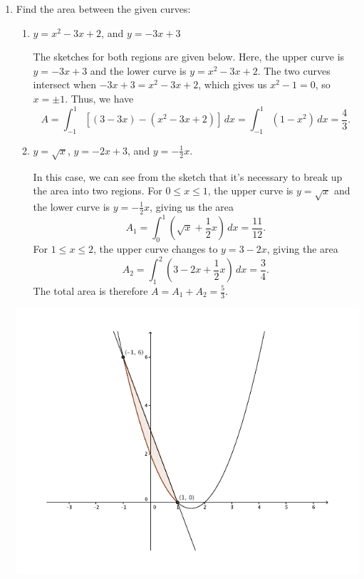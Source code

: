 \documentclass[12pt]{article}
\begin{document}
\begin{enumerate}
\begin{enumerate}
\end{enumerate}
 \item Find the area between the given curves:
\begin{enumerate}
 \item $y=x^2-3x+2$, and $y=-3x+3$

The sketches for both regions are given below. Here, the upper curve is $y=-3x+3$ and the lower curve is $y=x^2-3x+2$. The two curves intersect when $-3x+3=x^2-3x+2$, which gives us $x^2-1=0$, so $x=\pm 1$. Thus, we have
\[
 A = \int_{-1}^1[(3-3x)-(x^2-3x+2)]\,dx = \int_{-1}^1(1-x^2)\,dx = \frac{4}{3}.
\]


 \item $y=\sqrt{x}$, $y=-2x+3$, and $y=-\frac{1}{2}x$.

In this case, we can see from the sketch that it's necessary to break up the area into two regions. For $0\leq x\leq 1$, the upper curve is $y=\sqrt{x}$ and the lower curve is $y=-\frac{1}{2}x$, giving us the area
\[
 A_1 = \int_0^1\left(\sqrt{x}+\frac{1}{2}x\right)\,dx =\frac{11}{12}.
\]
For $1\leq x\leq 2$, the upper curve changes to $y=3-2x$, giving the area
\[
 A_2 = \int_1^2\left(3-2x+\frac{1}{2}x\right)\,dx = \frac{3}{4}.
\]
The total area is therefore $A=A_1+A_2 = \frac{5}{3}$.
\end{enumerate}

\begin{multicols}{2}
 \includegraphics[width=0.9\columnwidth]{WS7-2a}


\end{multicols}
\end{enumerate}
\end{document}
